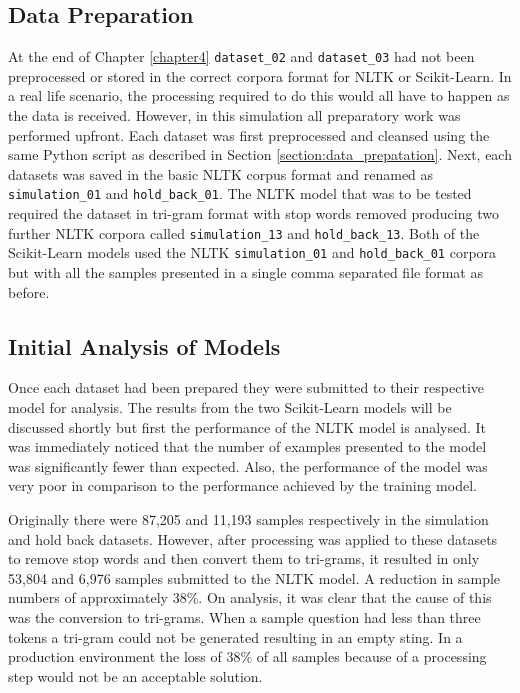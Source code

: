 \subsection{Data Preparation}
At the end of Chapter \ref{chapter4} \verb|dataset_02| and \verb|dataset_03| had not been preprocessed or stored in the correct corpora format for NLTK or Scikit-Learn. In a real life scenario, the processing required to do this would all have to happen as the data is received. However, in this simulation all preparatory work was performed upfront. Each dataset was first preprocessed and cleansed using the same Python script as described in Section \ref{section:data_prepatation}. Next, each datasets was saved in the basic NLTK corpus format and renamed as \verb|simulation_01| and \verb|hold_back_01|. The NLTK model that was to be tested required the dataset in tri-gram format with stop words removed producing two further NLTK corpora called \verb|simulation_13| and \verb|hold_back_13|. Both of the Scikit-Learn models used the NLTK \verb|simulation_01| and \verb|hold_back_01| corpora but with all the samples presented in a single comma separated file format as before.


\subsection{Initial Analysis of Models}
Once each dataset had been prepared they were submitted to their respective model for analysis. The results from the two Scikit-Learn models will be discussed shortly but first the performance of the NLTK model is analysed. It was immediately noticed that the number of examples presented to the model was significantly fewer than expected. Also, the performance of the model was very poor in comparison to the performance achieved by the training model.

Originally there were 87,205 and 11,193 samples respectively in the simulation and hold back datasets. However, after processing was applied to these datasets to remove stop words and then convert them to tri-grams, it resulted in only 53,804 and 6,976 samples submitted to the NLTK model. A reduction in sample numbers of approximately 38\%. On analysis, it was clear that the cause of this was the conversion to tri-grams. When a sample question had less than three tokens a tri-gram could not be generated resulting in an empty sting. In a production environment the loss of 38\% of all samples because of a processing step would not be an acceptable  solution.

